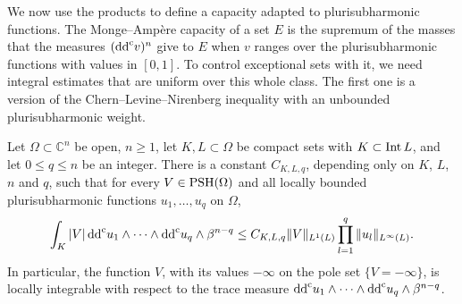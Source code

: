 We now use the products to define a capacity adapted to plurisubharmonic functions. The Monge--Amp\`ere capacity of a set $E$ is the supremum of the masses that the measures $(\mathrm{dd}^{\mathrm{c}} v)^n$ give to $E$ when $v$ ranges over the plurisubharmonic functions with values in $[0,1]$. To control exceptional sets with it, we need integral estimates that are uniform over this whole class. The first one is a version of the Chern--Levine--Nirenberg inequality with an unbounded plurisubharmonic weight.

\begin{theorem}\label{thm:cln-weighted}
Let $\Omega\subset\mathbb C^n$ be open, $n\ge1$, let $K,L\subset\Omega$ be compact sets with $K\subset\operatorname{Int} L$, and let $0\le q\le n$ be an integer. There is a constant $C_{K,L,q}$, depending only on $K$, $L$, $n$ and $q$, such that for every $V\in\mathrm{PSH}(\Omega)$ and all locally bounded plurisubharmonic functions $u_1,\ldots,u_q$ on $\Omega$,
\[
 \int_K |V|\,\mathrm{dd}^{\mathrm{c}} u_1\wedge\cdots\wedge\mathrm{dd}^{\mathrm{c}} u_q\wedge\beta^{n-q}
 \le C_{K,L,q}\|V\|_{L^1(L)}
            \prod_{l=1}^q\|u_l\|_{L^\infty(L)}.
\]
In particular, the function $V$, with its values $-\infty$ on the pole set $\{V=-\infty\}$, is locally integrable with respect to the trace measure $\mathrm{dd}^{\mathrm{c}} u_1\wedge\cdots\wedge\mathrm{dd}^{\mathrm{c}} u_q\wedge\beta^{n-q}$.
\end{theorem}
